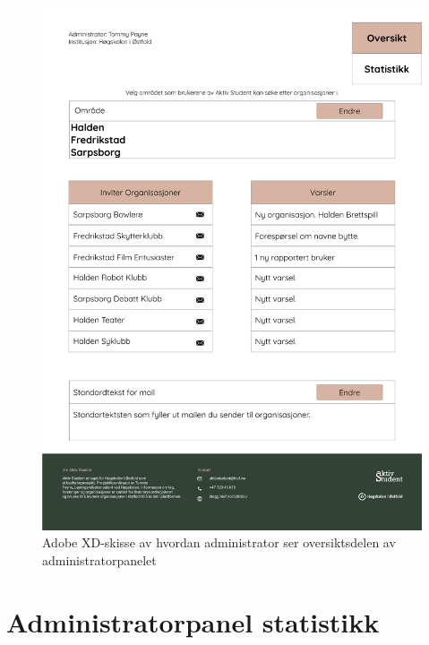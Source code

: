 \begin{figure}[H]
\centering
\includegraphics[width=.9\textwidth]{Illustrasjoner/Skisser-pdf/3.0/3-19-admin-oversikt.pdf}
\caption{Adobe XD-skisse av hvordan administrator ser oversiktsdelen av administratorpanelet}
\label{vedlegg:3-19-admin-oversikt}
\end{figure}

\section{Administratorpanel statistikk}

